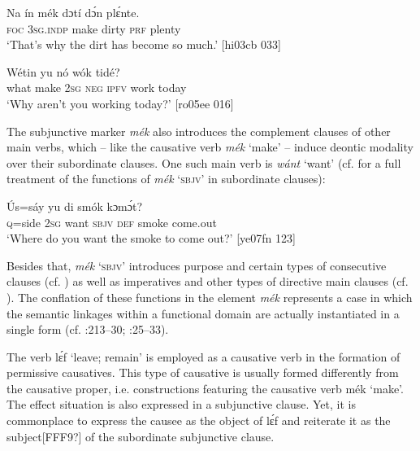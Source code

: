 \ea%
    \label{ex:key:1329}
    \gll Na  ín    mék    dɔtí    dɔ́n  plɛ́nte.\\
\textsc{foc}  \textsc{3sg.indp}  make  dirty  \textsc{prf}  plenty\\

\glt ‘That’s why the dirt has become so much.’ [hi03cb 033]
\z


\ea%
    \label{ex:key:1330}
    \gll Wétin      yu  nó    wók    tidé?\\
what  make  \textsc{2sg}  \textsc{neg}  \textsc{ipfv}  work  today\\

\glt ‘Why aren’t you working today?’ [ro05ee 016]
\z

The subjunctive marker \textit{mék} also introduces the complement clauses of other main verbs, which – like the causative verb \textit{mék} ‘make’ – induce deontic modality over their subordinate clauses. One such main verb is \textit{wánt} ‘want’\textit{}  (cf.  for a full treatment of the functions of \textit{mék} ‘\textsc{sbjv’} in subordinate clauses): 


\ea%
    \label{ex:key:1331}
    \gll \'{U}s=sáy  yu        di  smók  kɔmɔ́t?\\
\textsc{q}=side  \textsc{2sg}  want  \textsc{sbjv}    \textsc{def}  smoke  come.out\\

\glt ‘Where do you want the smoke to come out?’ [ye07fn 123]
\z

Besides that, \textit{mék} ‘\textsc{sbjv}’ introduces purpose and certain types of consecutive clauses (cf. ) as well as imperatives and other types of directive main clauses (cf. ). The conflation of these functions in the element \textit{mék} represents a case in which the semantic linkages within a functional domain are actually instantiated in a single form (cf. \citealt{PerkinsPagliuca1994}:213–30; \citealt{Song2001}:25–33).


The verb lɛ́f ‘leave; remain’ is employed as a causative verb in the formation of permissive causatives. This type of causative is usually formed differently from the causative proper, i.e. constructions featuring the causative verb mék ‘make’. The effect situation is also expressed in a subjunctive clause. Yet, it is commonplace to express the causee as the object of lɛ́f and reiterate it as the subject[FFF9?] of the subordinate subjunctive clause. 



